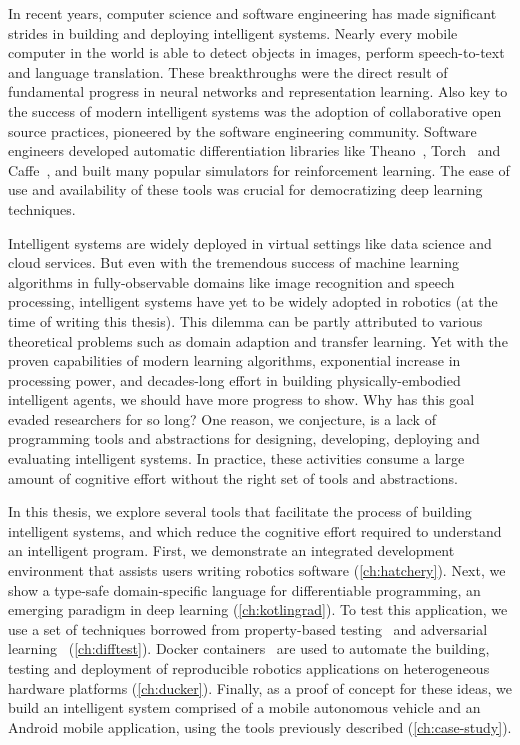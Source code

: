 \documentclass[12pt,initial,twoside,maitrise]{dms}
\numberwithin{equation}{section}
\numberwithin{table}{chapter}
\numberwithin{figure}{chapter}
\begin{document}
In recent years, computer science and software engineering has made significant strides in building and deploying intelligent systems. Nearly every mobile computer in the world is able to detect objects in images, perform speech-to-text and language translation. These breakthroughs were the direct result of fundamental progress in neural networks and representation learning. Also key to the success of modern intelligent systems was the adoption of collaborative open source practices, pioneered by the software engineering community. Software engineers developed automatic differentiation libraries like Theano~\citep{bergstra2010theano}, Torch~\citep{collobert2002torch} and Caffe~\citep{jia2014caffe}, and built many popular simulators for reinforcement learning. The ease of use and availability of these tools was crucial for democratizing deep learning techniques.

Intelligent systems are widely deployed in virtual settings like data science and cloud services. But even with the tremendous success of machine learning algorithms in fully-observable domains like image recognition and speech processing, intelligent systems have yet to be widely adopted in robotics (at the time of writing this thesis). This dilemma can be partly attributed to various theoretical problems such as domain adaption and transfer learning. Yet with the proven capabilities of modern learning algorithms, exponential increase in processing power, and decades-long effort in building physically-embodied intelligent agents, we should have more progress to show. Why has this goal evaded researchers for so long? One reason, we conjecture, is a lack of programming tools and abstractions for designing, developing, deploying and evaluating intelligent systems. In practice, these activities consume a large amount of cognitive effort without the right set of tools and abstractions.

In this thesis, we explore several tools that facilitate the process of building intelligent systems, and which reduce the cognitive effort required to understand an intelligent program. First, we demonstrate an integrated development environment that assists users writing robotics software (\autoref{ch:hatchery}). Next, we show a type-safe domain-specific language for differentiable programming, an emerging paradigm in deep learning (\autoref{ch:kotlingrad}). To test this application, we use a set of techniques borrowed from property-based testing~\citep{fink1997property} and adversarial learning~\citep{lowd2005adversarial} (\autoref{ch:difftest}). Docker containers~\citep{merkel2014docker} are used to automate the building, testing and deployment of reproducible robotics applications on heterogeneous hardware platforms (\autoref{ch:ducker}). Finally, as a proof of concept for these ideas, we build an intelligent system comprised of a mobile autonomous vehicle and an Android mobile application, using the tools previously described (\autoref{ch:case-study}).
\end{document}
